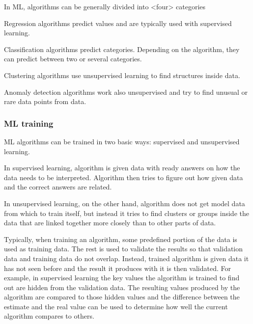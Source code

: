 In ML, 
algorithms can be generally divided into <four> categories

Regression algorithms predict values
and are typically used with supervised learning.

Classification algorithms predict categories.
Depending on the algorithm,
they can predict between two or several categories.

Clustering algorithms use unsupervised learning
to find structures inside data.

Anomaly detection algorithms work also unsupervised
and try to find unusual or rare data points from data.



\subsubsection*{ML training}
ML algorithms can be trained in two basic ways:
supervised and unsupervised learning.

In supervised learning,
algorithm is given data with ready answers on
how the data needs to be interpreted.
Algorithm then tries to figure out
how given data and the correct answers are related.

In unsupervised learning,
on the other hand,
algorithm does not get model data from which to train itself,
but instead it tries to find clusters or groups inside the data
that are linked together more closely than to other parts of data.

Typically,
when training an algorithm,
some predefined portion of the data
is used as training data.
The rest is used to validate the results
so that validation data and training data do not overlap.
Instead, trained algorithm is given data it has not seen before
and the result it produces with it is then validated.
For example,
in supervised learning
the key values the algorithm is trained to find out
are hidden from the validation data.
The resulting values produced by the algorithm
are compared to those hidden values
and the difference between the estimate and the real value
can be used to determine how well the current algorithm compares to others.

